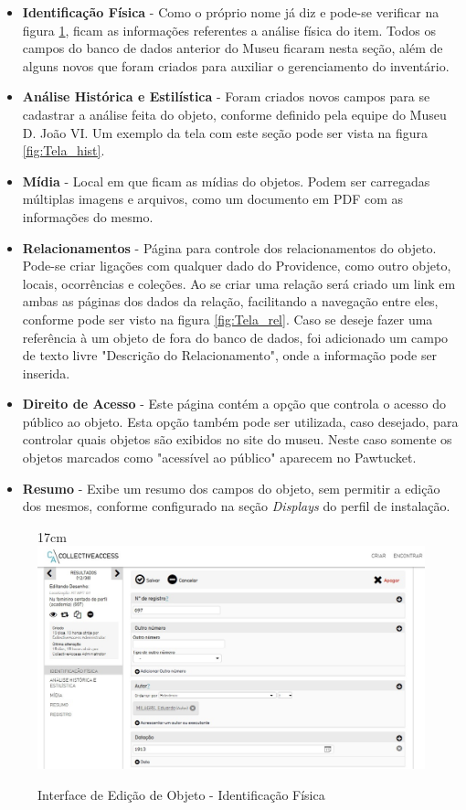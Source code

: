 \documentclass[a4paper,12pt,oneside,onecolumn,final,fleqn]{repUERJ}
\begin{document}
\begin{itemize}
	\item \textbf{Identificação Física} - Como o próprio nome já diz e pode-se verificar na figura \ref{fig:tela_id_fis},  ficam as informações referentes a análise física do item. Todos os campos do banco de dados anterior do Museu ficaram nesta seção, além de alguns novos que foram criados para auxiliar o gerenciamento do inventário.
	\item \textbf{Análise Histórica e Estilística} - Foram criados novos campos para se cadastrar a análise feita do objeto, conforme definido pela equipe do Museu D. João VI. Um exemplo da tela com este seção pode ser vista na figura \ref{fig:Tela_hist}. 
	\item \textbf{Mídia} - Local em que ficam as mídias do objetos. Podem ser carregadas múltiplas imagens e arquivos, como um documento em PDF com as informações do mesmo.
	\item \textbf{Relacionamentos} - Página para controle dos relacionamentos do objeto. Pode-se criar ligações com qualquer dado do Providence, como outro objeto, locais, ocorrências e coleções. Ao se criar uma relação será criado um link em ambas as páginas dos dados da relação, facilitando a navegação entre eles, conforme pode ser visto na figura \ref{fig:Tela_rel}. Caso se deseje fazer uma referência à um objeto de fora do banco de dados, foi adicionado um campo de texto livre "Descrição do Relacionamento", onde a informação pode ser inserida.
	\item \textbf{Direito de Acesso} - Este página contém a opção que controla o acesso do público ao objeto. Esta opção também pode ser utilizada, caso desejado, para controlar quais objetos são exibidos no site do museu. Neste caso somente os objetos marcados como "acessível ao público" aparecem no Pawtucket.
	\item \textbf{Resumo} - Exibe um resumo dos campos do objeto, sem permitir a edição dos mesmos, conforme configurado na seção \textit{Displays} do perfil de instalação.
\end{itemize}

\begin{figure}[!ht]{17cm}
	\includegraphics[width=15cm, center]{figuras/tela_id_fis.jpg}
	\caption{Interface de Edição de Objeto - Identificação Física} \label{fig:tela_id_fis}
\end{figure}
\end{document}
